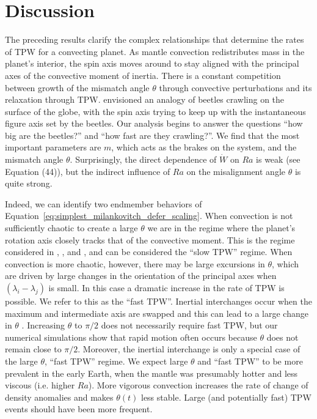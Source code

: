\documentclass[preprint,12pt,authoryear]{elsarticle}
\begin{document}
\section{Discussion}
\label{sec:discussion}

The preceding results clarify the complex relationships that determine the rates of TPW for a convecting planet.
As mantle convection redistributes mass in the planet's interior, the spin axis moves around to stay aligned with the principal axes of the convective moment of inertia. 
There is a constant competition between growth of the mismatch angle $\theta$ through convective perturbations
 and its relaxation through TPW.
\citet{goldreich1969some} envisioned an analogy of beetles crawling on the surface of the globe, with
the spin axis trying to keep up with the instantaneous figure axis set by the beetles.
Our analysis begins to answer the questions ``how big are the beetles?'' and ``how fast are they crawling?''. We find that the most important parameters are $m$, which acts as the brakes on the system, and the mismatch angle $\theta$. Surprisingly, the direct dependence of $\dot{W}$ on $Ra$ is weak (see Equation (44)), but the indirect influence of $Ra$ on the misalignment angle $\theta$ is quite strong.

Indeed, we can identify two endmember behaviors of Equation~\eqref{eq:simplest_milankovitch_defer_scaling}.
When convection is not sufficiently chaotic to create a large $\theta$ we are in the regime where the planet's rotation axis closely tracks that of the convective moment.
This is the regime considered in \citet{steinberger1997changes}, \citet{roberts2007cause}, and \citet{zhong2007supercontinent}, and can be considered the ``slow TPW'' regime.
When convection is more chaotic, however, there may be large excursions in $\theta$, 
which are driven by large changes in the orientation of the principal axes when $(\lambda_i - \lambda_j)$ is small.  
In this case a dramatic increase in the rate of TPW is possible. We refer to this as the ``fast TPW''. Inertial interchanges occur when the maximum and intermediate axis are swapped and this can lead to a large change in 
 $\theta$ \citep{kirschvink1997evidence}.  Increasing $\theta$ to $\pi/2$ does not necessarily require fast TPW, but our numerical simulations show that rapid motion often occurs because $\theta$ does not remain close to $\pi/2$.  Moreover, the inertial interchange is only  a special case of the large $\theta$, ``fast TPW'' regime. We expect large $\theta$ and ``fast TPW'' to be more prevalent in the early Earth, when the mantle was presumably hotter and less viscous (i.e. higher $Ra$). 
More vigorous convection increases the rate of change of density anomalies  and  makes
$\theta(t)$ less stable. Large (and potentially fast) TPW events should have been more frequent.
\end{document}
